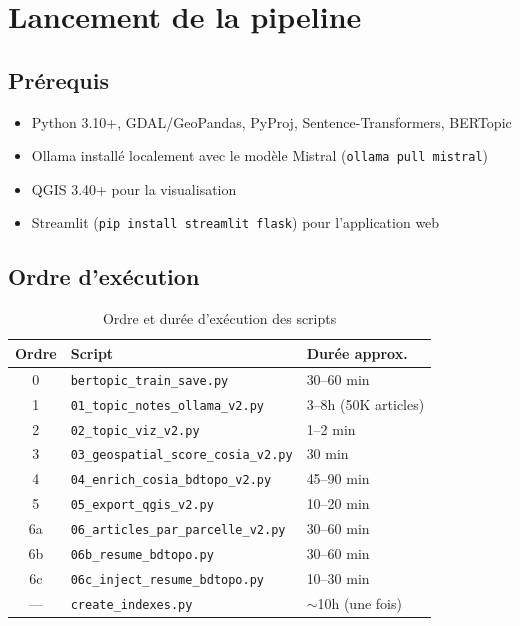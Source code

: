 \documentclass[11pt,a4paper]{report}
\newcommand{\code}[1]{\texttt{\small #1}}
\begin{document}
\section{Lancement de la pipeline}

\subsection{Prérequis}

\begin{itemize}
  \item Python 3.10+, GDAL/GeoPandas, PyProj, Sentence-Transformers, BERTopic
  \item Ollama installé localement avec le modèle Mistral (\code{ollama pull mistral})
  \item QGIS 3.40+ pour la visualisation
  \item Streamlit (\code{pip install streamlit flask}) pour l'application web
\end{itemize}

\subsection{Ordre d'exécution}

\begin{table}[H]
\centering
\begin{tabular}{cll}
\toprule
\rowcolor{seuilgris!75}
\textbf{Ordre} & \textbf{Script} & \textbf{Durée approx.} \\
\midrule
0 & \code{bertopic\_train\_save.py} & 30–60 min \\
1 & \code{01\_topic\_notes\_ollama\_v2.py} & 3–8h (50K articles) \\
2 & \code{02\_topic\_viz\_v2.py} & 1–2 min \\
3 & \code{03\_geospatial\_score\_cosia\_v2.py} & 30 min \\
4 & \code{04\_enrich\_cosia\_bdtopo\_v2.py} & 45–90 min \\
5 & \code{05\_export\_qgis\_v2.py} & 10–20 min \\
6a & \code{06\_articles\_par\_parcelle\_v2.py} & 30–60 min \\
6b & \code{06b\_resume\_bdtopo.py} & 30–60 min \\
6c & \code{06c\_inject\_resume\_bdtopo.py} & 10–30 min \\
— & \code{create\_indexes.py} & $\sim$10h (une fois) \\
\bottomrule
\end{tabular}
\caption{Ordre et durée d'exécution des scripts}
\end{table}
\end{document}
